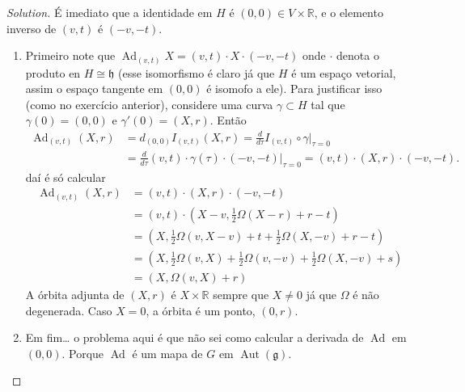 \begin{proof}[Solution]\leavevmode
É imediato que a identidade em $H$ é $(0,0)\in V\times \mathbb{R}$, e o elemento inverso de $(v,t)$  é $(-v,-t)$.
 \begin{enumerate}[label=\alph*.]
	\item Primeiro note que $\operatorname{Ad}_{(v,t)}X=(v,t)\cdot X\cdot(-v,-t)$ onde $\cdot$ denota o produto en $H\cong \mathfrak{h}$ (esse isomorfismo é claro já que $H$ é um espaço vetorial, assim o espaço tangente em $(0,0)$  é isomofo a ele). Para justificar isso (como no exercício anterior), considere uma curva $\gamma\subset H$ tal que $\gamma(0)=(0,0)$ e $\gamma'(0)=(X,r)$. Então 
		\begin{align*}
			\operatorname{Ad}_{(v,t)}(X,r)&=d_{(0,0)}I_{(v,t)}(X,r)=\frac{d}{d\tau}I_{(v,t)}\circ \gamma\Big|_{\tau=0}\\&=\frac{d}{d\tau}(v,t)\cdot \gamma(\tau)\cdot(-v,-t)\Big|_{\tau=0}=(v,t)\cdot (X,r)\cdot(-v,-t).
		\end{align*}
daí é só calcular
		\begin{align*}
			\operatorname{Ad}_{(v,t)}(X,r)&=(v,t)\cdot(X,r)\cdot(-v,-t)\\
			&=(v,t)\cdot\left(X-v, \frac{1}{2}\Omega(X-r)+r-t \right) \\
			&=\left( X,\frac{1}{2}\Omega(v,X-v)+t+\frac{1}{2}\Omega(X,-v)+r-t \right) \\
			&=\left( X,\frac{1}{2}\Omega(v,X)+\frac{1}{2}\Omega(v,-v)+\frac{1}{2}\Omega(X,-v)+s \right) \\
			&=(X,\Omega(v,X)+r)
		\end{align*}
A órbita adjunta de $(X,r)$  é $X\times \mathbb{R}$ sempre que $X\neq 0$ já que $\Omega$ é não degenerada. Caso $X=0$, a  órbita é um ponto, $(0,r)$.

\item Em fim… o problema aqui é que não sei como calcular a derivada de $\operatorname{Ad}$ em $(0,0)$. Porque  $\operatorname{Ad}$ é um mapa de $G$ em  $\operatorname{Aut}(\mathfrak{g})$. 

\end{enumerate}
\end{proof}

